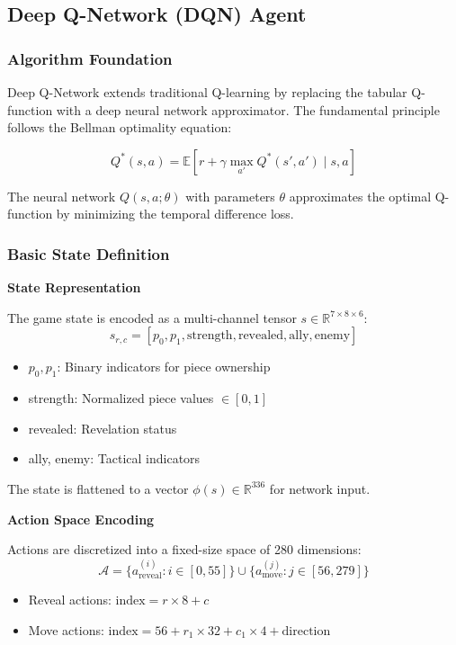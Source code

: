 \documentclass{article}
\begin{document}
\subsection{Deep Q-Network (DQN) Agent}

\subsubsection{Algorithm Foundation}

Deep Q-Network extends traditional Q-learning by replacing the tabular Q-function with a deep neural network approximator. The fundamental principle follows the Bellman optimality equation:

\[ Q^*(s,a) = \mathbb{E}[r + \gamma \max_{a'} Q^*(s',a') \mid s,a] \]

The neural network $Q(s,a;\theta)$ with parameters $\theta$ approximates the optimal Q-function by minimizing the temporal difference loss.

\subsubsection{Basic State Definition}

\textbf{State Representation}

The game state is encoded as a multi-channel tensor $s \in \mathbb{R}^{7 \times 8 \times 6}$:
\[ s_{r,c} = [p_0, p_1, \text{strength}, \text{revealed}, \text{ally}, \text{enemy}] \]

\begin{itemize}
  \item $p_0, p_1$: Binary indicators for piece ownership
  \item strength: Normalized piece values $\in [0,1]$
  \item revealed: Revelation status
  \item ally, enemy: Tactical indicators
\end{itemize}

The state is flattened to a vector $\phi(s) \in \mathbb{R}^{336}$ for network input.

\textbf{Action Space Encoding}

Actions are discretized into a fixed-size space of 280 dimensions:
\[ \mathcal{A} = \{a_{\text{reveal}}^{(i)} : i \in [0,55]\} \cup \{a_{\text{move}}^{(j)} : j \in [56,279]\} \]

\begin{itemize}
  \item Reveal actions: $\text{index} = r \times 8 + c$
  \item Move actions: $\text{index} = 56 + r_1 \times 32 + c_1 \times 4 + \text{direction}$
\end{itemize}
\end{document}
